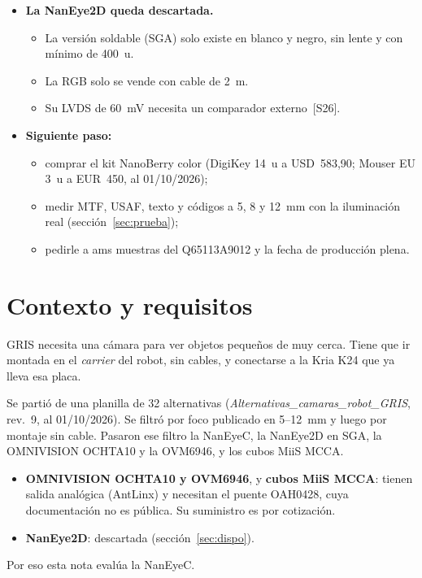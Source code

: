 \documentclass[11pt,a4paper]{article}
\begin{document}
\begin{itemize}
  \begin{itemize}
    \item Hay un único fabricante y la versión RGB figura en \emph{preproducción}~[S3].
    \item Se vende solo por bandeja de 496~u: DigiKey, USD~58,443 c/u, 0 en stock, 12~semanas~[S4].
    \item El código viejo figura obsoleto porque la producción pasó a Focuslight con códigos nuevos; no es una discontinuación~[S2].
  \end{itemize}
  \item \textbf{La NanEye2D queda descartada.}
  \begin{itemize}
    \item La versión soldable (SGA) solo existe en blanco y negro, sin lente y con mínimo de 400~u.
    \item La RGB solo se vende con cable de 2~m.
    \item Su LVDS de 60~mV necesita un comparador externo~[S26].
  \end{itemize}
  \item \textbf{Siguiente paso:}
  \begin{itemize}
    \item comprar el kit NanoBerry color (DigiKey 14~u a USD~583,90; Mouser EU 3~u a EUR~450, al 01/10/2026);
    \item medir MTF, USAF, texto y códigos a 5, 8 y 12~mm con la iluminación real (sección~\ref{sec:prueba});
    \item pedirle a ams muestras del Q65113A9012 y la fecha de producción plena.
  \end{itemize}
\end{itemize}

\section{Contexto y requisitos}

GRIS necesita una cámara para ver objetos pequeños de muy cerca. Tiene que ir montada en el \emph{carrier} del robot, sin cables, y conectarse a la Kria K24 que ya lleva esa placa.

Se partió de una planilla de 32 alternativas (\emph{Alternativas\_camaras\_robot\_GRIS}, rev.~9, al 01/10/2026). Se filtró por foco publicado en 5--12~mm y luego por montaje sin cable. Pasaron ese filtro la NanEyeC, la NanEye2D en SGA, la OMNIVISION OCHTA10 y la OVM6946, y los cubos MiiS MCCA.
\begin{itemize}
  \item \textbf{OMNIVISION OCHTA10 y OVM6946}, y \textbf{cubos MiiS MCCA}: tienen salida analógica (AntLinx) y necesitan el puente OAH0428, cuya documentación no es pública. Su suministro es por cotización.
  \item \textbf{NanEye2D}: descartada (sección~\ref{sec:dispo}).
\end{itemize}
Por eso esta nota evalúa la NanEyeC.
\end{document}
